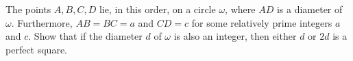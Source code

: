 The points $A,B,C,D$ lie, in this order, on a circle $\omega$,  where $AD$ is a diameter of $\omega$. Furthermore, $AB=BC=a$ and $CD=c$ for some relatively prime integers $a$ and $c$. Show that if the diameter $d$ of $\omega$ is also an integer, then either $d$ or $2d$ is a perfect square.